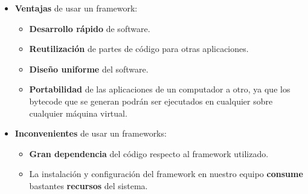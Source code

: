 \begin{itemize}
    \item \textbf{Ventajas} de usar un framework:
    \begin{itemize}
        \item \textbf{Desarrollo rápido} de software.
        \item \textbf{Reutilización} de partes de código para otras aplicaciones.
        \item \textbf{Diseño uniforme} del software.
        \item \textbf{Portabilidad} de las aplicaciones de un computador a otro, ya que los bytecode que se generan podrán ser ejecutados en cualquier sobre cualquier máquina virtual.
    \end{itemize}

    \item \textbf{Inconvenientes} de usar un frameworks:
    \begin{itemize}
        \item \textbf{Gran dependencia} del código respecto al framework utilizado.
        \item La instalación y configuración del framework en nuestro equipo \textbf{consume} bastantes \textbf{recursos} del sistema.
    \end{itemize}
\end{itemize}





\glsaddall
\printglossaries


\newpage
{}



